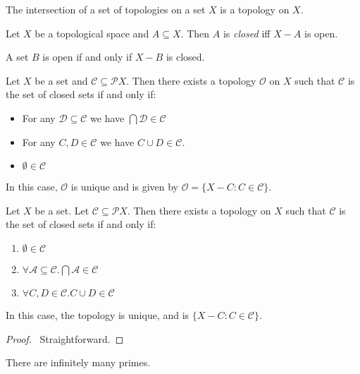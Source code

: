 \begin{prop}
The intersection of a set of topologies on a set $X$ is a topology on $X$.
\end{prop}

\begin{df}
Let $X$ be a topological space and $A \subseteq X$. Then $A$ is \emph{closed} iff $X - A$ is open.
\end{df}

\begin{prop}
A set $B$ is open if and only if $X - B$ is closed.
\end{prop}

\begin{prop}
Let $X$ be a set and $\mathcal{C} \subseteq \mathcal{P} X$. Then there exists a topology $\mathcal{O}$ on $X$ such that $\mathcal{C}$ is the set of closed sets if and only if:
\begin{itemize}
\item For any $\mathcal{D} \subseteq \mathcal{C}$ we have $\bigcap \mathcal{D} \in \mathcal{C}$
\item For any $C, D \in \mathcal{C}$ we have $C \cup D \in \mathcal{C}$.
\item $\emptyset \in \mathcal{C}$
\end{itemize}
In this case, $\mathcal{O}$ is unique and is given by $\mathcal{O} = \{ X - C : C \in \mathcal{C} \}$.
\end{prop}

\begin{thm}
Let $X$ be a set. Let $\mathcal{C} \subseteq \mathcal{P} X$. Then there exists a topology on $X$ such that $\mathcal{C}$ is the set of closed sets if and only if:
\begin{enumerate}
\item $\emptyset \in \mathcal{C}$
\item $\forall \mathcal{A} \subseteq \mathcal{C}. \bigcap \mathcal{A} \in \mathcal{C}$
\item $\forall C,D \in \mathcal{C}. C \cup D \in \mathcal{C}$
\end{enumerate}
In this case, the topology is unique, and is $\{ X - C : C \in \mathcal{C} \}$.
\end{thm}

\begin{proof}
\pf\ Straightforward.
\end{proof}

\begin{thm}
There are infinitely many primes.
\end{thm}

